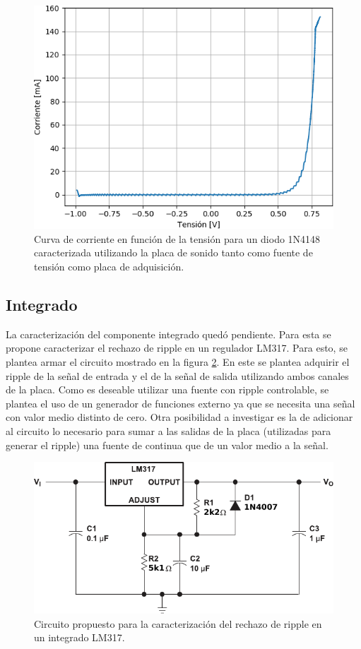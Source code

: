 \documentclass[a4paper,11pt]{article}
\begin{document}
	\begin{figure}[h]
		\centering
		\includegraphics[width=\textwidth]{imagenes/Diodo1N4148.png}
		\caption{Curva de corriente en función de la tensión para un diodo 1N4148 caracterizada utilizando la placa de sonido tanto como fuente de tensión como placa de adquisición.}
		\label{fig:diodo}
	\end{figure}
	
	\subsection{Integrado}	\label{sec:integrado}
	
	La caracterización del componente integrado quedó pendiente. Para esta se propone caracterizar el rechazo de ripple en un regulador LM317. Para esto, se plantea armar el circuito mostrado en la figura \ref{fig:lm317}. En este se plantea adquirir el ripple de la señal de entrada y el de la señal de salida utilizando ambos canales de la placa. Como es deseable utilizar una fuente con ripple controlable, se plantea el uso de un generador de funciones externo ya que se necesita una señal con valor medio distinto de cero. Otra posibilidad a investigar es la de adicionar al circuito lo necesario para sumar a las salidas de la placa (utilizadas para generar el ripple) una fuente de continua que de un valor medio a la señal.
		
	\begin{figure}[h]
		\centering
		\includegraphics[width=\textwidth]{imagenes/lm317}
		\caption{Circuito propuesto para la caracterización del rechazo de ripple en un integrado LM317.}
		\label{fig:lm317}
	\end{figure}
\end{document}
